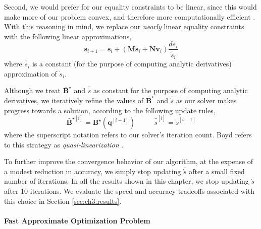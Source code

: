 
Second, we would prefer for our equality constraints to be linear, since this would make more of our problem convex, and therefore more computationally efficient \cite{boyd:2008}.
With this reasoning in mind, we replace our \emph{nearly} linear equality constraints with the following linear approximations,
%
\begin{equation}
\mathbf{s}_{i+1} = \mathbf{s}_{i} + (\mathbf{M}\mathbf{s}_{i} + \mathbf{N}\mathbf{v}_{i}) \frac{ds_i}{\bar{\dot{s}}_i}
\end{equation}
%
where $\bar{\dot{s}}_i$ is a constant (for the purpose of computing analytic derivatives) approximation of $\dot{s}_i$.

Although we treat $\bar{\mathbf{B}}^{\star}$ and $\bar{\dot{s}}$ as constant for the purpose of computing analytic derivatives, we iteratively refine the values of $\bar{\mathbf{B}}^{\star}$ and $\bar{\dot{s}}$ as our solver makes progress towards a solution, according to the following update rules,
%
\begin{equation}
\bar{\mathbf{B}}^{\star [i]} = \mathbf{B}^{\star}(\mathbf{q}^{[i-1]}) ~~~~~~~~~~~~ \bar{\dot{s}}^{[i]} = \dot{s}^{[i-1]}
\end{equation}
%
where the superscript notation refers to our solver's iteration count.
Boyd refers to this strategy as \emph{quasi-linearization} .

To further improve the convergence behavior of our algorithm, at the expense of a modest reduction in accuracy, we simply stop updating $\bar{\dot{s}}$ after a small fixed number of iterations.
In all the results shown in this chapter, we stop updating $\bar{\dot{s}}$ after 10 iterations.
We evaluate the speed and accuracy tradeoffs associated with this choice in Section \ref{sec:ch3:results}.

\paragraph{Fast Approximate Optimization Problem}

